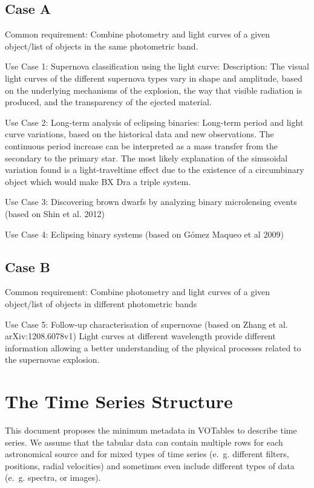 \documentclass[11pt,a4paper]{ivoa}
\begin{document}
\subsection{Case A}
Common requirement: Combine photometry and light curves of a given object/list of objects in the same photometric band. 
\begin{description}
\item Use Case 1: Supernova classification using the light curve: 
Description: The visual light curves of the different supernova types vary in shape and amplitude, based on the underlying mechanisms of the explosion, the way that visible radiation is produced, and the transparency of the ejected material.
\item Use Case 2: Long-term analysis of eclipsing binaries: Long-term period and light curve variations, based on the historical data and new observations. The continuous period increase can be interpreted as a mass transfer from the secondary to the primary star. The most likely explanation of the sinusoidal variation found is a light-traveltime effect due to the existence of a circumbinary object which would make BX Dra a triple system.
\item Use Case 3: Discovering brown dwarfs by analyzing binary microlensing events (based on Shin et al. 2012)
\item Use Case 4: Eclipsing binary systems (based on G\'omez Maqueo et al 2009)
\end{description}
\subsection{Case B}
Common requirement: Combine photometry and light curves of a given object/list of objects in different photometric bands
\begin{description}
\item Use Case 5: Follow-up characterisation of supernovae (based on Zhang et al. arXiv:1208.6078v1)
  Light curves at different wavelength provide different information allowing a better understanding of the physical processes related to the supernovae explosion.
\end{description}

\section{The Time Series Structure}
\label{elem:TIMESERIES}
This document proposes the minimum metadata in VOTables to describe time series. We assume that the tabular data can contain multiple rows for each astronomical source and for mixed types of time series (e.~g. different filters, positions, radial velocities) and sometimes even include different types of data (e.~g. spectra, or images). 
\end{document}

